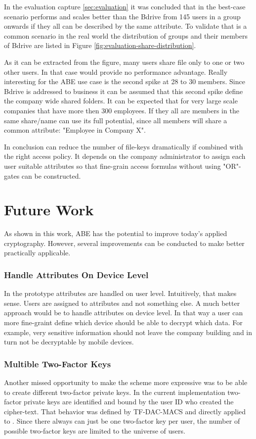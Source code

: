 In the evaluation capture \ref{sec:evaluation} it was concluded that in the best-case scenario \name performs and scales better than the Bdrive from 145 users in a group onwards if they all can be described by the same attribute. To validate that is a common scenario in the real world the distribution of groups and their members of Bdrive are listed in Figure \ref{fig:evaluation-share-distribution}.

As it can be extracted from the figure, many users share file only to one or two other users. In that case would \name provide no performance  advantage. Really interesting for the ABE use case is the second spike at 28 to 30 members. Since Bdrive is addressed to business it can be assumed that this second spike define the company wide shared folders. It can be expected that for very large scale companies that have more then 300 employees. If they all are members in the same share/name can use its full potential, since all members will share a common attribute: "Employee in Company X".

In conclusion \name can reduce the number of file-keys dramatically if combined with the right access policy. It depends on the company administrator to assign each user suitable attributes so that fine-grain access formulas without using "OR"-gates can be constructed.  

\section{Future Work}
As shown in this work, ABE has the potential to improve today's applied cryptography. However, several improvements can be conducted to make \name better practically applicable.

\subsubsection{Handle Attributes On Device Level}
In the prototype attributes are handled on user level. Intuitively, that makes sense. Users are assigned to attributes and not something else. A much better approach would be to handle attributes on device level. In that way a user can more fine-graint define which device should be able to decrypt which data. For example, very sensitive information should not leave the company building and in turn not be decryptable by mobile devices. 

\subsubsection{Multible Two-Factor Keys}
Another missed opportunity to make the scheme more expressive was to be able to create different two-factor private keys. In the current implementation two-factor private keys are identified and bound by the user ID who created the cipher-text. That behavior was defined by TF-DAC-MACS and directly applied to \name. Since there always can just be one two-factor key per user, the number of possible two-factor keys are limited to the universe of users.

